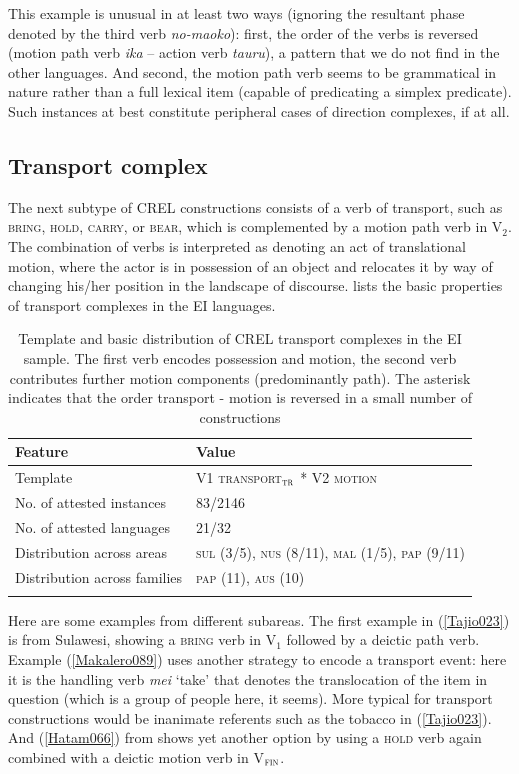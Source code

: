 This example is unusual in at least two ways (ignoring the resultant phase denoted by the third verb \textit{no-maoko}): first, the order of the verbs is reversed (motion path verb \textit{ika} -- action verb \textit{tauru}), a pattern that we do not find in the other languages. And second, the motion path verb seems to be grammatical in nature rather than a full lexical item (capable of predicating a simplex predicate). Such instances at best constitute peripheral cases of direction complexes, if at all.

\subsection{Transport complex} \label{sec:transport}

The next subtype of CREL constructions consists of a verb of transport, such as \textsc{bring}, \textsc{hold}, \textsc{carry}, or \textsc{bear}, which is complemented by a motion path verb in V$_2$. The combination of verbs is interpreted as denoting an act of translational motion, where the actor is in possession of an object and relocates it by way of changing his/her position in the landscape of discourse.  lists the basic properties of transport complexes in the EI languages. 

\begin{table}
\begin{tabular}{ll}
\lsptoprule
Feature&Value\tabularnewline
\midrule
Template&V1 \textsc{transport$_{\textsc{tr}}$} * V2 \textsc{motion}\tabularnewline
No. of attested instances& 83/2146 \tabularnewline
No. of attested languages& 21/32 \tabularnewline
Distribution across areas& \textsc{sul} (3/5), \textsc{nus} (8/11), \textsc{mal} (1/5), \textsc{pap} (9/11) \tabularnewline
Distribution across families& \textsc{pap} (11), \textsc{aus} (10) \tabularnewline
\lspbottomrule
\end{tabular}
\caption[Template and basic distribution of CREL transport complexes]{Template and basic distribution of CREL transport complexes in the EI sample. The first verb encodes possession and motion, the second verb contributes further motion components (predominantly path). The asterisk indicates that the order transport - motion is reversed in a small number of constructions}
\label{table:basiccreltransport}
\end{table}

\largerpage[-1]
Here are some examples from different subareas. The first example in (\ref{Tajio023}) is from Sulawesi, showing a \textsc{bring} verb in V$_{1}$ followed by a deictic path verb. Example (\ref{Makalero089}) uses another strategy to encode a transport event: here it is the handling verb \textit{mei} `take' that denotes the translocation of the item in question (which is a group of people here, it seems). More typical for transport constructions would be inanimate referents such as the tobacco in (\ref{Tajio023}). And (\ref{Hatam066}) from  shows yet another option by using a \textsc{hold} verb again combined with a deictic motion verb in V$_{\textsc{fin}}$.


